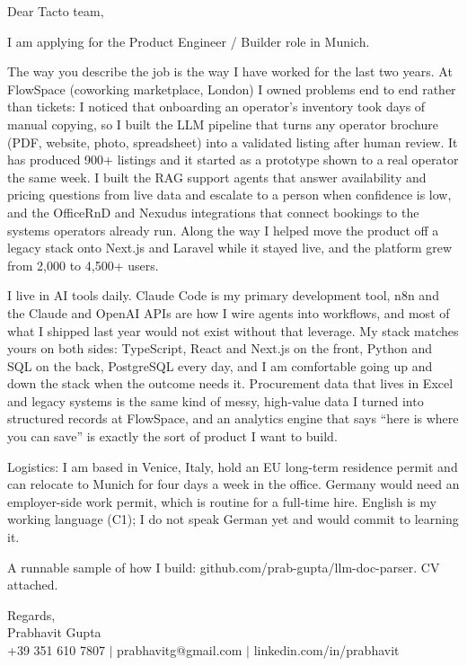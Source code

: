 \documentclass[a4paper,11pt]{article}
\begin{document}
Dear Tacto team,

I am applying for the Product Engineer / Builder role in Munich.

The way you describe the job is the way I have worked for the last two years. At FlowSpace (coworking marketplace, London) I owned problems end to end rather than tickets: I noticed that onboarding an operator's inventory took days of manual copying, so I built the LLM pipeline that turns any operator brochure (PDF, website, photo, spreadsheet) into a validated listing after human review. It has produced 900+ listings and it started as a prototype shown to a real operator the same week. I built the RAG support agents that answer availability and pricing questions from live data and escalate to a person when confidence is low, and the OfficeRnD and Nexudus integrations that connect bookings to the systems operators already run. Along the way I helped move the product off a legacy stack onto Next.js and Laravel while it stayed live, and the platform grew from 2,000 to 4,500+ users.

I live in AI tools daily. Claude Code is my primary development tool, n8n and the Claude and OpenAI APIs are how I wire agents into workflows, and most of what I shipped last year would not exist without that leverage. My stack matches yours on both sides: TypeScript, React and Next.js on the front, Python and SQL on the back, PostgreSQL every day, and I am comfortable going up and down the stack when the outcome needs it. Procurement data that lives in Excel and legacy systems is the same kind of messy, high-value data I turned into structured records at FlowSpace, and an analytics engine that says ``here is where you can save'' is exactly the sort of product I want to build.

Logistics: I am based in Venice, Italy, hold an EU long-term residence permit and can relocate to Munich for four days a week in the office. Germany would need an employer-side work permit, which is routine for a full-time hire. English is my working language (C1); I do not speak German yet and would commit to learning it.

A runnable sample of how I build: github.com/prab-gupta/llm-doc-parser. CV attached.

Regards,\\
Prabhavit Gupta\\
+39 351 610 7807 $\vert$ prabhavitg@gmail.com $\vert$ linkedin.com/in/prabhavit
\end{document}
